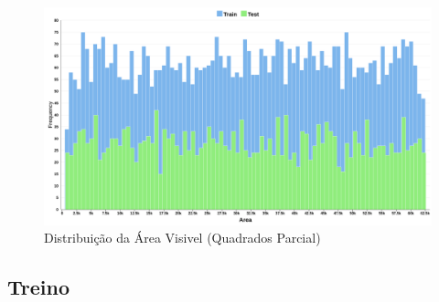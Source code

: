 \begin{figure}[H]
    \centering
    \includegraphics[width=1.0\linewidth]{imgs/Test_5/5/dataset/Partial_Squares_Area_Distribution_Hist.png}
    \caption{Distribuição da Área Visivel (Quadrados Parcial)}
    \label{fig:enter-label}
\end{figure}

\subsection{Treino}

